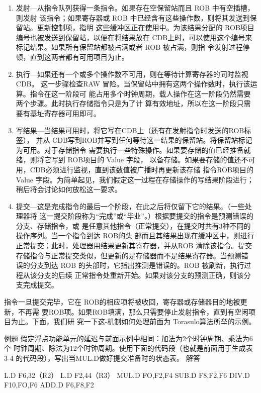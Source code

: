 \begin{enumerate}
    \item 发射—从指令队列获得一条指令。如果存在空保留站而且 ROB 中有空插槽，则发射
    该指令；如果寄存器或 ROB 中已经含有这些操作数，则将其发送到保留站。更新控制项，指明
    这些缓冲区正在使用中。为该结果分配的 ROB项目编号也被发送到保留站，以便在将结果放在
    CDB上时，可以使用这个编号来标记结果。如果所有保留站都被占满或者 ROB 被占满，则指
    令发射过程停顿，直到这两者都有可用项目为止。
    \item 执行—如果还有一个或多个操作数不可用，则在等待计算寄存器的同时监视 CDB。
    这一步骤检查RAW 冒险。当保留站中拥有这两个操作数时，执行该运算。指令在这一阶段可
    能占用多个时钟周期，载人操作在这一阶段仍然需要两个步骤。此时执行存储指令只是为了计
    算有效地址，所以在这一阶段只需要有基址寄存器可用即可。
    \item 写结果—当结果可用时，将它写在CDB上（还有在发射指令时发送的ROB标签），
    并从 CDB写到ROB并写到任何等待这一结果的保留站。将保留站标记为可用。对于存储指令
    需要执行一些特殊操作。如果要存储的值已经推备就绪，则将它写到 ROB项目的 Value 字段，
    以备存储。如果要存储的值还不可用，CDB必须进行监视，直到该数值被广播时再更新该存储
    指令ROB项目的Value 字段。为简单起见，我们假定这一过程在存储操作的写结果阶段进行；
    稍后将会讨论如何放松这一要求。
    \item 提交—这是完成指令的最后一个阶段，在此之后将仅留下它的结果。（一些处理器将
    这一提交阶段称为“完成”或“毕业”。）根据要提交的指令是预测错误的分支、存储指令，或
    是任意其他指令（正常提交），在提交时共有3种不同的操作序列。当一个指令到达 ROB的头
    部而且其结果出现在缓冲区中，则进行正常提交；此时，处理器用结果更新其寄存器，并从ROB
    清除该指令。提交存储指令与正常提交类似，但更新的是存储器而不是结果寄存器。当预测错
    误的分支到达 ROB 的头部时，它指出推测是错误的。ROB 被刷新，执行过程从该分支的后续
    正常指令处重新开始。如果对该分支的预测正确，则该分支完成提交。
\end{enumerate}

指令一旦提交完毕，它在 ROB的相应项将被收回，寄存器或存储器目的地被更新，不再需
要ROB项。如果ROB填满，那么只需要停止发射指令，直到有空闲项目为止。下面，我们研
究一下这-机制如何处理前面为 Torasulo算法所举的示例。

例题
假定浮点功能单元的延迟与前面示例中相同：加法为2个时钟周期、乘法为6个
时钟周期、除法为12个时钟周期。使用下面的代码段（也就是前面用于生成表3-4
的代码段），写出当MUL.D做好提交准备时的状态表。
解答

L.D
F6,32（R2）
L.D
F2,44（R3）
MUL.D
FO,F2,F4
SUB.D
F8,F2,F6
DIV.D
F10,FO,F6
ADD.D
F6,F8,F2

